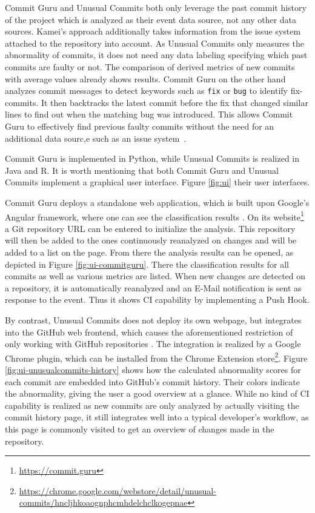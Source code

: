 Commit Guru and Unusual Commits both only leverage the past commit history of the project which is analyzed as their event data source, not any other data sources. Kamei's approach additionally takes information from the issue system attached to the repository into account.
As Unusual Commits only measures the abnormality of commits, it does not need any data labeling specifying which past commits are faulty or not. The comparison of derived metrics of new commits with average values already shows results.
Commit Guru on the other hand analyzes commit messages to detect keywords such as \texttt{fix} or \texttt{bug} to identify fix-commits. It then backtracks the latest commit before the fix that changed similar lines to find out when the matching bug was introduced. 
This allows Commit Guru to effectively find previous faulty commits without the need for an additional data sourc,e such as an issue system~\cite{Rosen2015}.

Commit Guru is implemented in Python, while Unusual Commits is realized in Java and R. It is worth mentioning that both Commit Guru and Unusual Commits implement a graphical user interface. 
Figure \ref{fig:ui} their user interfaces. 

Commit Guru deploys a standalone web application, which is built upon Google's Angular framework, where one can see the classification results \cite{Rosen2015}. On its website\footnote{\url{https://commit.guru}} a Git repository URL can be entered to initialize the analysis. This repository will then be added to the ones continuously reanalyzed on changes and will be added to a list on the page. From there the analysis results can be opened, as depicted in Figure \ref{fig:ui-commitguru}. There the classification results for all commits as well as various metrics are listed. When new changes are detected on a repository, it is automatically reanalyzed and an E-Mail notification is sent as response to the event. Thus it shows CI capability by implementing a Push Hook.

By contrast, Unusual Commits does not deploy its own webpage, but integrates into the GitHub web frontend, which causes the aforementioned restriction of only working with GitHub repositories \cite{Goyal2017}. The integration is realized by a Google Chrome plugin, which can be installed from the Chrome Extension store\footnote{\url{https://chrome.google.com/webstore/detail/unusual-commits/hncljhkoaognphcmhdelchclkogepnae}}. Figure \ref{fig:ui-unusualcommits-history} shows how the calculated abnormality scores for each commit are embedded into GitHub's commit history. Their colors indicate the abnormality, giving the user a good overview at a glance. While no kind of CI capability is realized as new commits are only analyzed by actually visiting the commit history page, it still integrates well into a typical developer's workflow, as this page is commonly visited to get an overview of changes made in the repository. 

